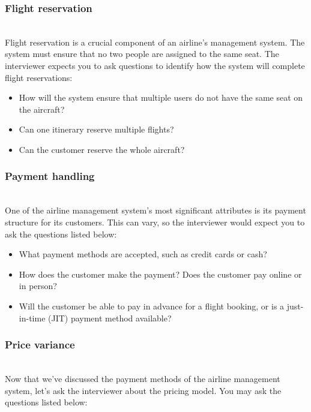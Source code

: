 \subsubsection{Flight reservation}\label{G7woD7WtXV9EPxz16RdLF}
\\
Flight reservation is a crucial component of an airline's management system. The system must ensure that no two people are assigned to the same seat. The interviewer expects you to ask questions to identify how the system will complete flight reservations:

\begin{itemize}
\item
\protect{}\label{-eWR0r5OXnO2_b0IYztPA}
How will the system ensure that multiple users do not have the same seat on the aircraft?
\item
\protect{}\label{p6SR5O-WTMEn5sybQ3IiU}
Can one itinerary reserve multiple flights?
\item
\protect{}\label{4XUP_bA4QywxZo9OzyfsF}
Can the customer reserve the whole aircraft?
\end{itemize}

\subsubsection{Payment handling}\label{oCIUzeNtqXnruNjQEMTG6}
\\
One of the airline management system's most significant attributes is its payment structure for its customers. This can vary, so the interviewer would expect you to ask the questions listed below:

\begin{itemize}
\item
What payment methods are accepted, such as credit cards or cash?
\item
How does the customer make the payment? Does the customer pay online or in person?
\item
Will the customer be able to pay in advance for a flight booking, or is a just-in-time (JIT) payment method available?
\end{itemize}

\subsubsection{Price variance}\label{vF2EnW1Q6tClFed2Waw4G}
\\
Now that we've discussed the payment methods of the airline management system, let's ask the interviewer about the pricing model. You may ask the questions listed below:

